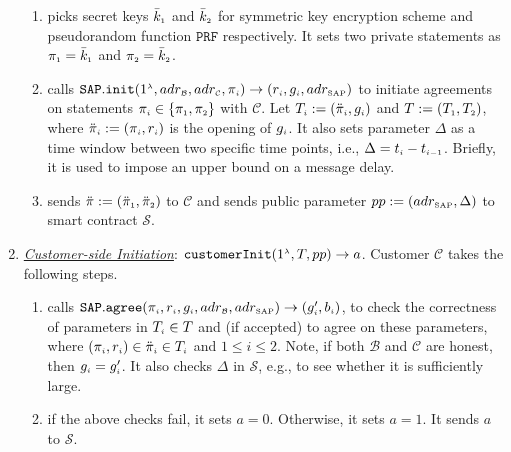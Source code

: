 \begin{enumerate}[leftmargin=.46cm]
\begin{enumerate}
\item\label{RCPoRP::setup} picks   secret keys $\bar k_{\scriptscriptstyle 1}$ and $\bar k_{\scriptscriptstyle 2}$ for  symmetric key encryption scheme and  pseudorandom function $\mathtt{PRF}$ respectively. It  sets two private statements as $\pi_{\scriptscriptstyle 1}=\bar k_{\scriptscriptstyle 1}$ and $\pi_{\scriptscriptstyle 2}= \bar k_{\scriptscriptstyle 2}$.
%
\item\label{RCPoRP::set-qp}  calls $\mathtt{SAP.init}(1^{\scriptscriptstyle\lambda}, adr_{\scriptscriptstyle\mathcal{B}}, adr_{\scriptscriptstyle\mathcal{C}}, \pi_{\scriptscriptstyle i})\rightarrow(r_{
\scriptscriptstyle i}, g_{\scriptscriptstyle i}, adr_{\scriptscriptstyle\text{SAP}})$ to initiate  agreements on  statements $\pi_{\scriptscriptstyle i}\in \{\pi_{\scriptscriptstyle 1}, \pi_{\scriptscriptstyle 2}\}$  with  $\mathcal{C}$.  Let $T_{\scriptscriptstyle i}:=(\ddot{\pi}_{\scriptscriptstyle i}, g_{\scriptscriptstyle i})$ and $T:=(T_{\scriptscriptstyle 1}, T_{\scriptscriptstyle 2})$,  where  $\ddot{\pi}_{\scriptscriptstyle i}:=(\pi_{\scriptscriptstyle i}, r_{\scriptscriptstyle i})$ is the opening of $g_{\scriptscriptstyle i}$.  It also sets parameter $\Delta$ as a time window between two specific time points, i.e., $\Delta=t_{\scriptscriptstyle i} - t_{\scriptscriptstyle i-1}$. Briefly, it is used to impose an upper bound on a message delay.  %
%
\item sends $\ddot{\pi}:=(\ddot{\pi}_{\scriptscriptstyle 1}, \ddot{\pi}_{\scriptscriptstyle 2})$ to   $\mathcal{C}$ and   sends  public parameter $pp:=(adr_{\scriptscriptstyle\text{SAP}},\Delta)$ to  smart contract $\mathcal{S}$.
%
\end{enumerate}


\item  \underline{\textit{Customer-side Initiation}}\label{customer-side-Initiation}: $\mathtt{customerInit} (1^{\scriptscriptstyle \lambda}, T, pp)\rightarrow a$.
%
Customer $\mathcal{C}$ takes the following steps. 

\begin{enumerate}
%
\item\label{customer-side-Initiation-SAP-agree} calls   $\mathtt{SAP.agree}(\pi_{\scriptscriptstyle i}, r_{\scriptscriptstyle i}, g_{\scriptscriptstyle i}, adr_{\scriptscriptstyle\mathcal{B}}, adr_{\scriptscriptstyle\text{SAP}})\rightarrow (g'_{\scriptscriptstyle i}, b_{\scriptscriptstyle i})$, to check the correctness of parameters in $T_{\scriptscriptstyle i}\in T$ and (if accepted) to agree on these parameters, where $(\pi_{\scriptscriptstyle i}, r_{\scriptscriptstyle i}) \in \ddot{\pi}_{\scriptscriptstyle i}\in T_{\scriptscriptstyle i}$ and $1\leq i \leq 2$. Note,  if both $\mathcal{B}$ and $\mathcal{C}$ are honest, then $g_{\scriptscriptstyle i}=g'_{\scriptscriptstyle i}$. It also checks $\Delta$ in  $\mathcal{S}$, e.g., to see whether it is sufficiently large.
%
\item if the above checks fail,  it sets $a=0$. Otherwise, it sets $a=1$. It sends $a$ to $\mathcal{S}$. 
\end{enumerate}
%


\end{enumerate}
